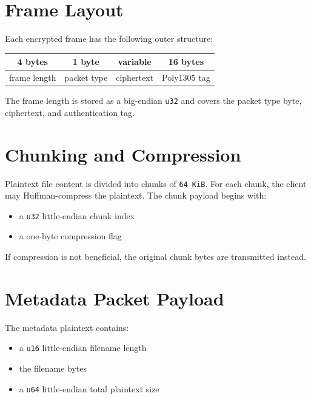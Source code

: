 \documentclass[11pt,a4paper]{report}
\begin{document}
\section{Frame Layout}

Each encrypted frame has the following outer structure:

\begin{center}
\begin{tabular}{|c|c|c|c|}
\hline
4 bytes & 1 byte & variable & 16 bytes \\
\hline
frame length & packet type & ciphertext & Poly1305 tag \\
\hline
\end{tabular}
\end{center}

The frame length is stored as a big-endian \texttt{u32} and covers the packet type byte, ciphertext, and authentication tag.

\section{Chunking and Compression}

Plaintext file content is divided into chunks of \texttt{64 KiB}. For each chunk, the client may Huffman-compress the plaintext. The chunk payload begins with:

\begin{itemize}[leftmargin=1.5cm]
    \item a \texttt{u32} little-endian chunk index
    \item a one-byte compression flag
\end{itemize}

If compression is not beneficial, the original chunk bytes are transmitted instead.

\section{Metadata Packet Payload}

The metadata plaintext contains:

\begin{itemize}[leftmargin=1.5cm]
    \item a \texttt{u16} little-endian filename length
    \item the filename bytes
    \item a \texttt{u64} little-endian total plaintext size
\end{itemize}
\end{document}
